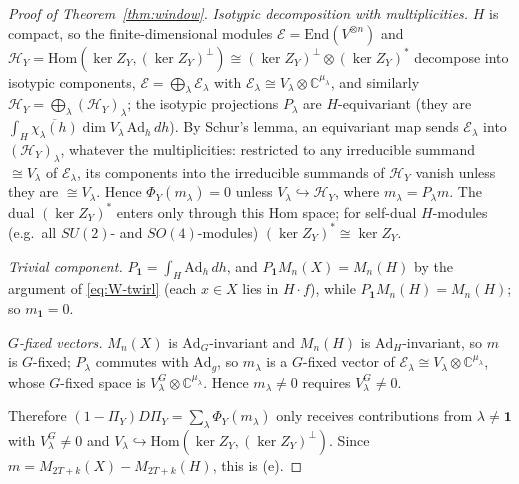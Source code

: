 \documentclass[11pt]{article}
\newcommand{\C}{\mathbb{C}}
\theoremstyle{definition}
\theoremstyle{remark}
\begin{document}
\begin{proof}[Proof of Theorem~\ref{thm:window}]
\emph{Isotypic decomposition with multiplicities.} $H$ is compact, so the finite-dimensional modules $\mathcal E=\mathrm{End}(V^{\otimes n})$ and
$\mathcal H_Y=\mathrm{Hom}(\ker Z_Y,(\ker Z_Y)^\perp)\cong(\ker Z_Y)^\perp\otimes(\ker Z_Y)^\ast$ decompose into isotypic components,
$\mathcal E=\bigoplus_\lambda\mathcal E_\lambda$ with $\mathcal E_\lambda\cong V_\lambda\otimes\C^{\mu_\lambda}$, and similarly $\mathcal H_Y=\bigoplus_\lambda(\mathcal H_Y)_\lambda$; the
isotypic projections $P_\lambda$ are $H$-equivariant (they are $\int_H\overline{\chi_\lambda(h)}\dim V_\lambda\,\mathrm{Ad}_h\,dh$). By Schur's lemma, an equivariant
map sends $\mathcal E_\lambda$ into $(\mathcal H_Y)_\lambda$, whatever the multiplicities: restricted to any irreducible summand $\cong V_\lambda$ of $\mathcal E_\lambda$, its
components into the irreducible summands of $\mathcal H_Y$ vanish unless they are $\cong V_\lambda$. Hence $\Phi_Y(m_\lambda)=0$ unless
$V_\lambda\hookrightarrow\mathcal H_Y$, where $m_\lambda=P_\lambda m$. The dual $(\ker Z_Y)^\ast$ enters only through this Hom space; for self-dual $H$-modules
(e.g.\ all $SU(2)$- and $SO(4)$-modules) $(\ker Z_Y)^\ast\cong\ker Z_Y$.

\emph{Trivial component.} $P_{\mathbf 1}=\int_H\mathrm{Ad}_h\,dh$, and $P_{\mathbf 1}M_n(X)=M_n(H)$ by the argument of \eqref{eq:W-twirl} (each $x\in X$ lies in
$H\cdot f$), while $P_{\mathbf 1}M_n(H)=M_n(H)$; so $m_{\mathbf 1}=0$.

\emph{$G$-fixed vectors.} $M_n(X)$ is $\mathrm{Ad}_G$-invariant and $M_n(H)$ is $\mathrm{Ad}_H$-invariant, so $m$ is $G$-fixed; $P_\lambda$ commutes with
$\mathrm{Ad}_g$, so $m_\lambda$ is a $G$-fixed vector of $\mathcal E_\lambda\cong V_\lambda\otimes\C^{\mu_\lambda}$, whose $G$-fixed space is $V_\lambda^G\otimes\C^{\mu_\lambda}$.
Hence $m_\lambda\ne0$ requires $V_\lambda^G\ne0$.

Therefore $(1-\Pi_Y)D\Pi_Y=\sum_\lambda\Phi_Y(m_\lambda)$ only receives contributions from $\lambda\ne\mathbf 1$ with $V_\lambda^G\ne0$ and
$V_\lambda\hookrightarrow\mathrm{Hom}(\ker Z_Y,(\ker Z_Y)^\perp)$. Since $m=M_{2T+k}(X)-M_{2T+k}(H)$, this is (e).
\end{proof}
\end{document}
